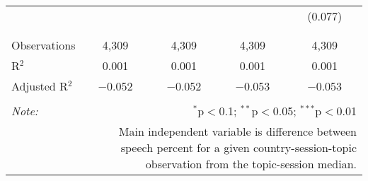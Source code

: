 \begin{table}[!htbp]
\begin{tabular}{@{\extracolsep{5pt}}lcccc}
  &  &  &  & (0.077) \\ 
  & & & & \\ 
\hline \\[-1.8ex] 
Observations & 4,309 & 4,309 & 4,309 & 4,309 \\ 
R$^{2}$ & 0.001 & 0.001 & 0.001 & 0.001 \\ 
Adjusted R$^{2}$ & $-$0.052 & $-$0.052 & $-$0.053 & $-$0.053 \\ 
\hline 
\hline \\[-1.8ex] 
\textit{Note:}  & \multicolumn{4}{r}{$^{*}$p$<$0.1; $^{**}$p$<$0.05; $^{***}$p$<$0.01} \\ 
 & \multicolumn{4}{r}{Main independent variable is difference between speech percent for a given country-session-topic observation from the topic-session median.} \\ 
\end{tabular} 
\end{table} 
